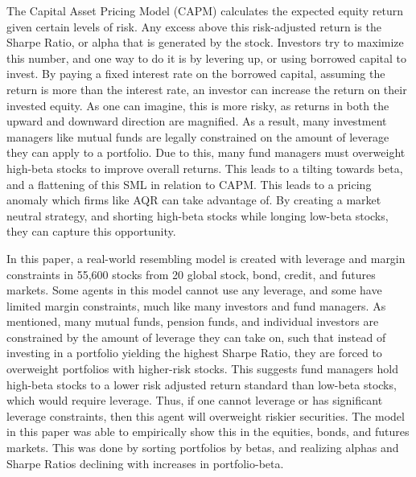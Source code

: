 \documentclass[12pt,twoside]{reedthesis}
\theoremstyle{definition}
\theoremstyle{definition}
\theoremstyle{definition}
\theoremstyle{remark}
\begin{document}
The Capital Asset Pricing Model (CAPM) calculates the expected equity
return given certain levels of risk. Any excess above this risk-adjusted
return is the Sharpe Ratio, or alpha that is generated by the stock.
Investors try to maximize this number, and one way to do it is by
levering up, or using borrowed capital to invest. By paying a fixed
interest rate on the borrowed capital, assuming the return is more than
the interest rate, an investor can increase the return on their invested
equity. As one can imagine, this is more risky, as returns in both the
upward and downward direction are magnified. As a result, many
investment managers like mutual funds are legally constrained on the
amount of leverage they can apply to a portfolio. Due to this, many fund
managers must overweight high-beta stocks to improve overall returns.
This leads to a tilting towards beta, and a flattening of this SML in
relation to CAPM. This leads to a pricing anomaly which firms like AQR
can take advantage of. By creating a market neutral strategy, and
shorting high-beta stocks while longing low-beta stocks, they can
capture this opportunity.

In this paper, a real-world resembling model is created with leverage
and margin constraints in 55,600 stocks from 20 global stock, bond,
credit, and futures markets. Some agents in this model cannot use any
leverage, and some have limited margin constraints, much like many
investors and fund managers. As mentioned, many mutual funds, pension
funds, and individual investors are constrained by the amount of
leverage they can take on, such that instead of investing in a portfolio
yielding the highest Sharpe Ratio, they are forced to overweight
portfolios with higher-risk stocks. This suggests fund managers hold
high-beta stocks to a lower risk adjusted return standard than low-beta
stocks, which would require leverage. Thus, if one cannot leverage or
has significant leverage constraints, then this agent will overweight
riskier securities. The model in this paper was able to empirically show
this in the equities, bonds, and futures markets. This was done by
sorting portfolios by betas, and realizing alphas and Sharpe Ratios
declining with increases in portfolio-beta.
\end{document}

